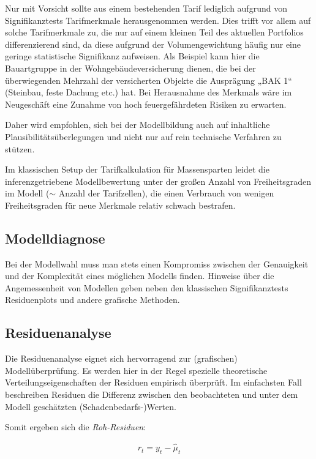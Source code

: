 Nur mit Vorsicht sollte aus einem bestehenden Tarif lediglich aufgrund von Signifikanztests Tarifmerkmale herausgenommen werden. Dies trifft vor allem auf solche Tarifmerkmale zu, die nur auf einem kleinen Teil des aktuellen Portfolios differenzierend sind, da diese aufgrund der Volumengewichtung häufig nur eine geringe statistische Signifikanz aufweisen. Als Beispiel kann hier die Bauartgruppe in der Wohngebäudeversicherung dienen, die bei der überwiegenden Mehrzahl der versicherten Objekte die Ausprägung „BAK 1“ (Steinbau, feste Dachung etc.) hat. Bei Herausnahme des Merkmals wäre im Neugeschäft eine Zunahme von hoch feuergefährdeten Risiken zu erwarten. 

Daher wird empfohlen, sich bei der Modellbildung auch auf inhaltliche Plausibilitätsüberlegungen und nicht nur auf rein technische Verfahren zu stützen. 

Im klassischen Setup der Tarifkalkulation für Massensparten leidet die inferenzgetriebene Modellbewertung unter der großen Anzahl von Freiheitsgraden im Modell ($\sim$ Anzahl der Tarifzellen), die einen Verbrauch von wenigen Freiheitsgraden für neue Merkmale relativ schwach bestrafen.





\subsection{Modelldiagnose}

Bei der Modellwahl muss man stets einen Kompromiss zwischen der Genauigkeit und der Komplexität eines möglichen Modells finden. Hinweise über die Angemessenheit von Modellen geben neben den klassischen Signifikanztests Residuenplots und andere grafische Methoden.

\subsection{Residuenanalyse}

Die Residuenanalyse eignet sich hervorragend zur (grafischen) Modellüberprüfung. Es werden hier in der Regel spezielle theoretische Verteilungseigenschaften der Residuen empirisch überprüft. Im einfachsten Fall beschreiben Residuen die Differenz zwischen den beobachteten und unter dem Modell geschätzten (Schadenbedarfs-)Werten. 

Somit ergeben sich die \textit{Roh-Residuen}: 

\begin{eqnarray} 
r_t=y_t - \hat{\mu}_t
\end{eqnarray}

